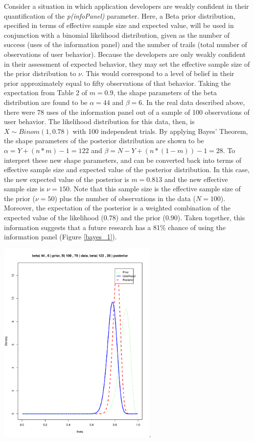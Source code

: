 \documentclass[]{article}
\begin{document}
Consider a situation in which application developers are weakly
confident in their quantification of the \emph{p(infoPanel)} parameter.
Here, a Beta prior distribution, specified in terms of effective sample
size and expected value, will be used in conjunction with a binomial
likelihood distribution, given as the number of success (uses of the
information panel) and the number of trails (total number of
observations of user behavior). Because the developers are only weakly
confident in their assessment of expected behavior, they may set the
effective sample size of the prior distribution to \(\nu\). This would
correspond to a level of belief in their prior approximately equal to
fifty observations of that behavior. Taking the expectation from Table 2
of \(m=0.9\), the shape parameters of the beta distribution are found to
be \(\alpha=44\) and \(\beta=6\). In the real data described above,
there were 78 uses of the information panel out of a sample of 100
observations of user behavior. The likelihood distribution for this
data, then, is \(X \sim Binom(1, 0.78)\) with 100 independent trials. By
applying Bayes' Theorem, the shape parameters of the posterior
distribution are shown to be \(\alpha = Y + (n*m) - 1 = 122\) and
\(\beta= N - Y + (n*(1-m)) - 1 = 28\). To interpret these new shape
parameters, \alpha and \beta can be converted back into terms of
effective sample size and expected value of the posterior distribution.
In this case, the new expected value of the posterior is \(m=0.813\) and
the new effective sample size is \(\nu=150\). Note that this sample size
is the effective sample size of the prior (\(\nu=50\)) plus the number
of observations in the data (\(N=100\)). Moreover, the expectation of
the posterior is a weighted combination of the expected value of the
likelihood (0.78) and the prior (\(0.90\)). Taken together, this
information suggests that a future research has a 81\% chance of using
the information panel (Figure \ref{bayes_1}).

\includegraphics[height=4.00000in]{./weak_posterior.pdf}.
\end{document}
